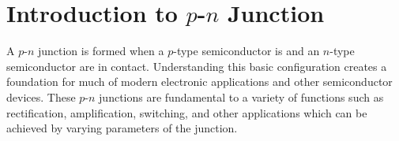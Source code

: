 \section{Introduction to $p$-$n$ Junction}\label{sec:sec001}
A $p$-$n$ junction is formed when a $p$-type semiconductor is and an $n$-type semiconductor are in contact.
Understanding this basic configuration creates a foundation for much of modern electronic
applications and other semiconductor devices. These $p$-$n$ junctions are fundamental to a variety of functions
such as rectification, amplification, switching, and other applications which can be achieved by varying parameters 
of the junction. 
